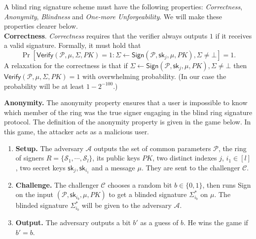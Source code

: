 \documentclass[runningheads]{llncs}
\begin{document}
A blind ring signature scheme must have the following properties:   \textit{Correctness},  \textit{Anonymity}, \textit{Blindness} and  \textit{One-more Unforgeability}. We will make these properties clearer below.\\




\noindent \textbf{Correctness}. \textit{Correctness} requires that the verifier always outputs $1$ if it receives a valid signature. Formally, it must hold that
$$\Pr[\textsf{Verify}(\mathcal{P}, \mu, \Sigma, PK)=1: \Sigma \leftarrow \textsf{Sign}(\mathcal{P},\mathsf{sk}_j,\mu, PK), \Sigma \neq \bot]=1.$$
A relaxation for the correctness is that  if $\Sigma \leftarrow \textsf{Sign}(\mathcal{P},\mathsf{sk}_j,\mu, PK), \Sigma \neq \bot$ then $\textsf{Verify}(\mathcal{P}, \mu, \Sigma, PK)=1$  with overwhelming probability. (In our case the probability will be at least $ 1-2^{-100}$.) 

\noindent \textbf{Anonymity.} \label{ano} The anonymity property ensures that a user is impossible to know which member of the ring was the true signer engaging in the blind ring signature protocol. The definition of the anonymity property is given in the game below. In this game, the attacker acts as a malicious user. %

\begin{enumerate}
	
	\item \textbf{Setup.} The adversary $\mathcal{A}$ outputs the set of common parameters $\mathcal{P}$, the ring of signers $R=\{ \mathcal{S}_1, \cdots, \mathcal{S}_l\}$, its public keys $PK$,  two distinct indexes $j$, $i_1 \in [l]$, two secret keys $\mathsf{sk}_{j}, \mathsf{sk}_{i_1}$ and a message $\mu$. They are sent to the challenger $\mathcal{C}$.
	\item \textbf{Challenge.} The challenger $\mathcal{C}$ chooses a random bit $b \in \{0,1\}$, then runs \textsf{Sign} on the input $(\mathcal{P}, \mathsf{sk}_{i_b}, \mu, PK)$ to get a blinded signature $\Sigma^*_{i_b}$ on $\mu$. The blinded signature $\Sigma^*_{i_b}$ will be given to the adversary $\mathcal{A}$.
	\item \textbf{Output.}  The adversary outputs a bit $b'$ as a guess of $b$. He wins the game if $b'=b$.
\end{enumerate}
\end{document}
